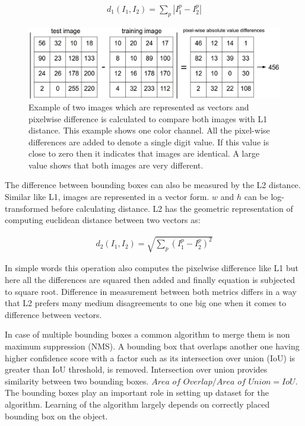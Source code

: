 \documentclass[11pt]{article}
\begin{document}
\begin{align*}
d_1 (I_1, I_2) = \sum_{p} \left| I^p_1 - I^p_2 \right|
\end{align*}

\begin{figure}[H]
	\includegraphics[width=\linewidth]{files/nneg.jpeg}
	\caption{Example of two images which are represented as vectors and pixelwise difference is calculated to compare both images with L1 distance. This example shows one color channel. All the pixel-wise differences are added to denote a single digit value. If this value is close to zero then it indicates that images are identical. A large value shows that both images are very different.}
	\label{fig: Example of two images which are represented as vectors and pixel-wise difference is calculated to compare both images with L1 distance. This example shows one color channel. All the pixel-wise differences are added to denote a single digit value. If this value is close to zero then it indicates that images are identical. A large value shows that both images are very different.}
\end{figure}

The difference between bounding boxes can also be measured by the L2 distance. Similar like L1, images are represented in a vector form. $w$ and $h$ can be log-transformed before calculating distance. L2 has the geometric representation of computing euclidean distance between two vectors as:

\begin{align*}
d_2 (I_1, I_2) = \sqrt{\sum_{p} \left( I^p_1 - I^p_2 \right)^2}
\end{align*}
 
In simple words this operation also computes the pixelwise difference like L1 but here all the differences are squared then added and finally equation is subjected to square root. Difference in measurement between both metrics differs in a way that L2 prefers many medium disagreements to one big one when it comes to difference between vectors.
 
In case of multiple bounding boxes a common algorithm to merge them is non maximum suppression (NMS). A bounding box that overlaps another one having higher confidence score with a factor such as its intersection over union (IoU) is greater than IoU threshold, is removed. Intersection over union provides similarity between two bounding boxes. ${\textit{Area of Overlap}} /{\textit{Area of Union}} = IoU
$. The bounding boxes play an important role in setting up dataset for the algorithm. Learning of the algorithm largely depends on correctly placed bounding box on the object.
\end{document}
